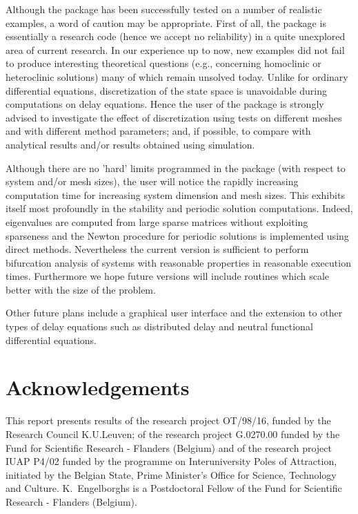\documentclass[10pt]{article}
\begin{document}
{Although
the package has been successfully tested on a number of realistic examples,
a word of caution may be appropriate. First of all, the package
is essentially a research code (hence we accept no
reliability) in a quite unexplored area of current
research. In our experience up to now, 
new examples did not fail to produce
interesting theoretical questions (e.g., concerning homoclinic
or heteroclinic solutions) many of which
remain unsolved today. 
Unlike for ordinary differential equations, discretization
of the state space is unavoidable during computations on
delay equations. Hence the user of the package is 
strongly advised 
to investigate the effect of discretization using tests on different
meshes and with different method parameters; and, if
possible, to compare with analytical results and/or results obtained
using simulation.

Although there are no 'hard' limits programmed in the package (with respect
to system and/or mesh sizes),
the user will notice the rapidly increasing computation time
for increasing system dimension and mesh sizes.
This exhibits itself most profoundly in the stability and
periodic solution computations. 
Indeed, eigenvalues are computed from large sparse matrices
without exploiting sparseness and the  
Newton procedure for periodic solutions is implemented using direct methods.
Nevertheless the current version is sufficient to perform
bifurcation analysis of systems with reasonable properties
in reasonable execution times. 
Furthermore we hope future versions will include routines 
which scale better with the size of the problem.

Other future plans include a graphical user interface and
the extension to other types
of delay equations such as distributed delay and
neutral functional differential equations.

\section*{Acknowledgements}

This report presents results of the research project 
OT/98/16, funded by the Research Council K.U.Leuven;
of the research project G.0270.00 funded 
by the Fund for Scientific Research - Flanders (Belgium) and of the 
research project IUAP P4/02 funded by the programme
on Interuniversity Poles of Attraction, initiated by the Belgian State,
Prime Minister's Office for Science, Technology and Culture.
K.~Engelborghs is a Postdoctoral Fellow of the Fund for Scientific 
Research - Flanders (Belgium).

}
\end{document}
